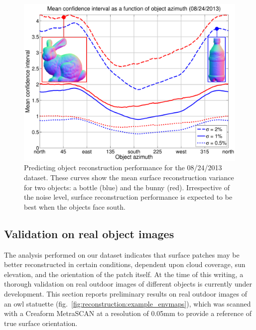\begin{figure}[t]
    \centering
    \includegraphics[width=\linewidth]{./figures/objectFig/objectFigNoise.pdf}
    \caption{Predicting object reconstruction performance for the 08/24/2013 dataset. These curves show the mean surface reconstruction variance for two objects: a bottle (blue) and the bunny (red). Irrespective of the noise level, surface reconstruction performance is expected to be best when the objects face south.}
    \label{fig:objects}
\end{figure}

\subsection{Validation on real object images}
\label{sec:validation}

The analysis performed on our dataset indicates that surface patches may be better reconstructed in certain conditions, dependent upon cloud coverage, sun elevation, and the orientation of the patch itself. At the time of this writing, a thorough validation on real outdoor images of different objects is currently under development. This section reports preliminary results on real outdoor images of an owl statuette (fig.~\ref{fig:reconstruction:example_envmaps}), which was scanned with a Creaform MetraSCAN at a resolution of 0.05mm to provide a reference of true surface orientation.

